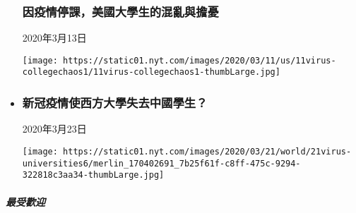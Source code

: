 \begin{itemize}
  \hypertarget{ux56e0ux75abux60c5ux505cux8ab2ux7f8eux570bux5927ux5b78ux751fux7684ux6df7ux4e82ux8207ux64d4ux6182}{%
  \subsubsection{因疫情停課，美國大學生的混亂與擔憂}\label{ux56e0ux75abux60c5ux505cux8ab2ux7f8eux570bux5927ux5b78ux751fux7684ux6df7ux4e82ux8207ux64d4ux6182}}

  2020年3月13日

  \texttt{[image: https://static01.nyt.com/images/2020/03/11/us/11virus-collegechaos1/11virus-collegechaos1-thumbLarge.jpg]}
\item
  \href{/world/20200323/coronavirus-chinese-students-uk/zh-hant/}{}

  \hypertarget{ux65b0ux51a0ux75abux60c5ux4f7fux897fux65b9ux5927ux5b78ux5931ux53bbux4e2dux570bux5b78ux751f}{%
  \subsubsection{新冠疫情使西方大學失去中國學生？}\label{ux65b0ux51a0ux75abux60c5ux4f7fux897fux65b9ux5927ux5b78ux5931ux53bbux4e2dux570bux5b78ux751f}}

  2020年3月23日

  \texttt{[image: https://static01.nyt.com/images/2020/03/21/world/21virus-universities6/merlin\_170402691\_7b25f61f-c8ff-475c-9294-322818c3aa34-thumbLarge.jpg]}
\end{itemize}

\hypertarget{ux6700ux53d7ux6b61ux8fce}{%
\subparagraph{最受歡迎}\label{ux6700ux53d7ux6b61ux8fce}}

